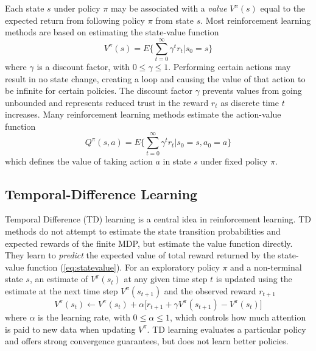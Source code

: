 Each state $s$ under policy $\pi$ may be associated with a \textit{value}
$V^\pi(s)$ equal to the expected return from following policy $\pi$ from state
$s$.  Most reinforcement learning methods are based on estimating the
state-value function
\begin{equation}
\label{eq:statevalue}
V^\pi(s) = E \Bigg\lbrace \sum^\infty_{t=0} \gamma^t r_t \Bigg\vert s_0 = s
\Bigg\rbrace
\end{equation}
where $\gamma$ is a discount factor, with $0\leq \gamma \leq 1$.
Performing certain actions may result in no state change, creating a loop and
causing the value of that action to be infinite for certain policies.
The discount factor $\gamma$ prevents values from going unbounded and
represents reduced trust in the reward $r_t$ as discrete time $t$
increases.  Many reinforcement learning methods estimate the action-value
function
\begin{equation}
\label{eq:actionvalue}
Q^\pi(s,a) = E \Bigg\lbrace \sum^\infty_{t=0} \gamma^t r_t \Bigg\vert s_0 = s,
a_0 = a \Bigg\rbrace
\end{equation}
which defines the value of taking action $a$ in state $s$ under fixed policy
$\pi$.

\subsection{Temporal-Difference Learning}
Temporal Difference (TD) learning is a central idea in reinforcement learning.
TD methods do not attempt to estimate the state transition probabilities and
expected rewards of the finite MDP, but estimate the value function directly.
They learn to \textit{predict} the expected value of total reward returned by
the state-value function (\ref{eq:statevalue}).  For an exploratory policy $\pi$
and a non-terminal state $s$, an estimate of $V^\pi(s_t)$ at any given time step
$t$ is updated using the estimate at the next time step $V^\pi(s_{t+1})$ and the
observed reward $r_{t+1}$
\begin{equation}
V^\pi(s_t) \leftarrow V^\pi(s_t) + \alpha \bigl[r_{t+1} + \gamma
V^\pi(s_{t+1}) - V^\pi(s_t) \bigr]
\end{equation}
where $\alpha$ is the learning rate, with $0 \leq \alpha \leq 1$, which controls
how much attention is paid to new data when updating $V^\pi$.  TD learning
evaluates a particular policy and offers strong convergence guarantees, but does
not learn better policies.

